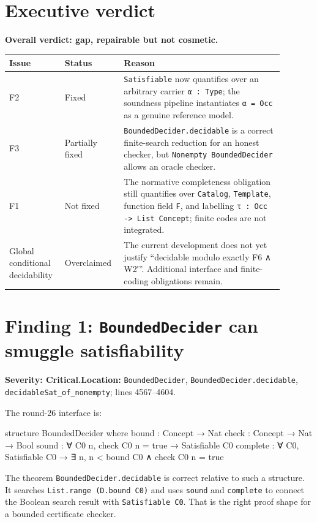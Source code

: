 \documentclass[11pt]{article}
\newcommand{\sev}[1]{\textbf{Severity: #1}}
\begin{document}
\section{Executive verdict}

\textbf{Overall verdict: gap, repairable but not cosmetic.}

\begin{center}
\begin{tabular}{@{}p{0.17\linewidth}p{0.18\linewidth}p{0.54\linewidth}@{}}
\toprule
Issue & Status & Reason \\
\midrule
F2 & Fixed & \texttt{Satisfiable} now quantifies over an arbitrary carrier \texttt{α : Type}; the soundness pipeline instantiates \texttt{α = Occ} as a genuine reference model. \\
F3 & Partially fixed & \texttt{BoundedDecider.decidable} is a correct finite-search reduction for an honest checker, but \texttt{Nonempty BoundedDecider} allows an oracle checker. \\
F1 & Not fixed & The normative completeness obligation still quantifies over \texttt{Catalog}, \texttt{Template}, function field \texttt{F}, and labelling \texttt{τ : Occ -> List Concept}; finite codes are not integrated. \\
Global conditional decidability & Overclaimed & The current development does not yet justify ``decidable modulo exactly F6 ∧ W2′''. Additional interface and finite-coding obligations remain. \\
\bottomrule
\end{tabular}
\end{center}

\section{Finding 1: \texttt{BoundedDecider} can smuggle satisfiability}

\sev{Critical.}\quad \textbf{Location:} \texttt{BoundedDecider}, \texttt{BoundedDecider.decidable}, \texttt{decidableSat\_of\_nonempty}; lines 4567--4604.

The round-26 interface is:

\begin{leancode}
structure BoundedDecider where
  bound : Concept → Nat
  check : Concept → Nat → Bool
  sound : ∀ C0 n, check C0 n = true → Satisfiable C0
  complete : ∀ C0, Satisfiable C0 → ∃ n, n < bound C0 ∧ check C0 n = true
\end{leancode}

The theorem \texttt{BoundedDecider.decidable} is correct relative to such a structure. It searches \texttt{List.range (D.bound C0)} and uses \texttt{sound} and \texttt{complete} to connect the Boolean search result with \texttt{Satisfiable C0}. That is the right proof shape for a bounded certificate checker.
\end{document}
